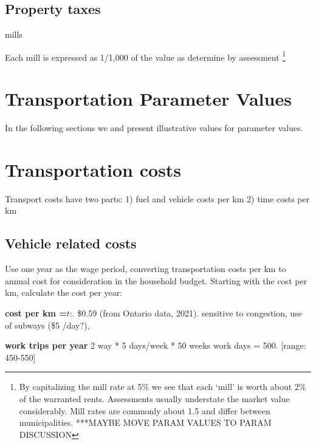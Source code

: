 \subsection{Property taxes}

mills

Each mill is expressed as  1/1,000 of the value as determine by assessment \footnote{By capitalizing the mill rate at 5\%  we see that each `mill' is worth about 2\% of the warranted rents. Assessments usually understate the market value considerably. Mill rates are commonly about 1.5 and differ between municipalities. ***MAYBE MOVE PARAM VALUES TO PARAM DISCUSSION}


\section{Transportation Parameter Values}
In the following sections we and present illustrative values for parameter values.


  
    
    
    
 

\section{Transportation costs}
Transport costs have two parts:
1) fuel and vehicle costs per km
2) time costs per km

\subsection{Vehicle related costs}
Use one year as the wage period, converting transportation costs per km to annual cost for consideration in the household budget. Starting with the cost per km, calculate the cost per year:

\textbf{cost per km =$\textit{t}$}:. \$0.59   (from  Ontario data, 2021). sensitive to congestion, use of subways (\$5 /day?), 

 \textbf{work trips per year} 2 way * 5 days/week * 50 weeks work days = 500. [range: 450-550]

